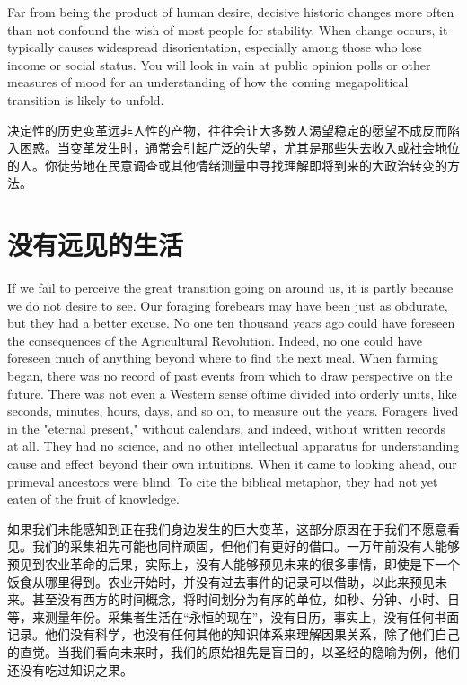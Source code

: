 \begin{paracol}{2}
\switchcolumn*
Far from being the product of human desire, decisive historic changes more often than not confound the wish of most people for stability. When change occurs, it typically causes widespread disorientation, especially among those who lose income or social status. You will look in vain at public opinion polls or other measures of mood for an understanding of how the coming megapolitical transition is likely to unfold.

\switchcolumn
决定性的历史变革远非人性的产物，往往会让大多数人渴望稳定的愿望不成反而陷入困惑。当变革发生时，通常会引起广泛的失望，尤其是那些失去收入或社会地位的人。你徒劳地在民意调查或其他情绪测量中寻找理解即将到来的大政治转变的方法。

\end{paracol}

\section{没有远见的生活}

\begin{paracol}{2}
If we fail to perceive the great transition going on around us, it is partly because we do not desire to see. Our foraging forebears may have been just as obdurate, but they had a better excuse. No one ten thousand years ago could have foreseen the consequences of the Agricultural Revolution. Indeed, no one could have foreseen much of anything beyond where to find the next meal. When farming began, there was no record of past events from which to draw perspective on the future. There was not even a Western sense oftime divided into orderly units, like seconds, minutes, hours, days, and so on, to measure out the years. Foragers lived in the "eternal present," without calendars, and indeed, without written records at all. They had no science, and no other intellectual apparatus for understanding cause and effect beyond their own intuitions. When it came to looking ahead, our primeval ancestors were blind. To cite the biblical metaphor, they had not yet eaten of the fruit of knowledge.    

\switchcolumn
如果我们未能感知到正在我们身边发生的巨大变革，这部分原因在于我们不愿意看见。我们的采集祖先可能也同样顽固，但他们有更好的借口。一万年前没有人能够预见到农业革命的后果，实际上，没有人能够预见未来的很多事情，即使是下一个饭食从哪里得到。农业开始时，并没有过去事件的记录可以借助，以此来预见未来。甚至没有西方的时间概念，将时间划分为有序的单位，如秒、分钟、小时、日等，来测量年份。采集者生活在“永恒的现在”，没有日历，事实上，没有任何书面记录。他们没有科学，也没有任何其他的知识体系来理解因果关系，除了他们自己的直觉。当我们看向未来时，我们的原始祖先是盲目的，以圣经的隐喻为例，他们还没有吃过知识之果。

\end{paracol}

